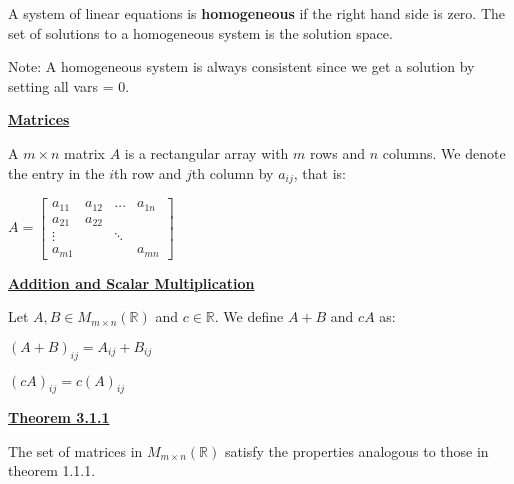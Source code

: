 \documentclass{letter}
\newcommand{\0}[1]{\begin{bmatrix}#1\end{bmatrix}}
\newcommand{\h}[1]{\underline{\textbf{#1}}}
\begin{document}
	A system of linear equations is \textbf{homogeneous} if the right hand side is zero. The set of solutions to a homogeneous system is the solution space.
	
	Note: A homogeneous system is always consistent since we get a solution by setting all vars = 0.
	
	\h{Matrices}
	
	A $m\times n$ matrix $A$ is a rectangular array with $m$ rows and $n$ columns. We denote the entry in the $i$th row and $j$th column by $a_{ij}$, that is:
	
	$A = \0{a_{11}&a_{12}&\dots&a_{1n}\\a_{21}&a_{22}\\\vdots&&\ddots\\a_{m1}&&&a_{mn}}$
	
	\h{Addition and Scalar Multiplication}
	
	Let $A, B \in M_{m\times n} (\mathbb{R})$ and $c \in \mathbb{R}$. We define $A + B$ and $cA$ as:
	
	$(A+B)_{ij} = A_{ij} + B_{ij}$
	
	$(cA)_{ij} = c(A)_{ij}$
	
	\h{Theorem 3.1.1}
	
	The set of matrices in $M_{m\times n} (\mathbb{R})$ satisfy the properties analogous to those in theorem 1.1.1.
\end{document}
